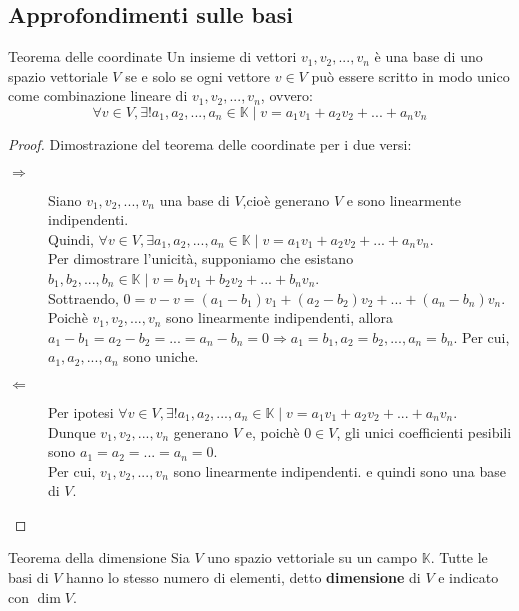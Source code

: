 \documentclass[a4paper]{article}
\theoremstyle{definition}
\begin{document}
\subsection{Approfondimenti sulle basi}
\begin{teo}{Teorema delle coordinate}{}
	Un insieme di vettori $v_1, v_2, ..., v_n$ è una base di uno spazio vettoriale $V$ se e solo se ogni vettore $v \in V$ può essere scritto in modo unico come combinazione lineare di $v_1, v_2, ..., v_n$, ovvero:
	\begin{equation*}
		\forall v \in V, \exists! a_1, a_2, ..., a_n \in \mathbb{K} \mid v = a_1v_1 + a_2v_2 + ... + a_nv_n
	\end{equation*}
\end{teo}
\begin{proof}
	Dimostrazione del teorema delle coordinate per i due versi:
	\begin{description}
		\item[$\Rightarrow$] Siano $v_1, v_2, ..., v_n$ una base di $V$,cioè generano $V$ e sono linearmente indipendenti. \\
		      Quindi, $\forall v \in V, \exists a_1, a_2, ..., a_n \in \mathbb{K} \mid v = a_1v_1 + a_2v_2 + ... + a_nv_n$. \\
		      Per dimostrare l'unicità, supponiamo che esistano $b_1, b_2, ..., b_n \in \mathbb{K} \mid v = b_1v_1 + b_2v_2 + ... + b_nv_n$. \\
		      Sottraendo, $0 = v - v = (a_1 - b_1)v_1 + (a_2 - b_2)v_2 + ... + (a_n - b_n)v_n$. \\
		      Poichè $v_1, v_2, ..., v_n$ sono linearmente indipendenti, allora $a_1 - b_1 = a_2 - b_2 = ... = a_n - b_n = 0 \Rightarrow a_1 = b_1, a_2 = b_2, ..., a_n = b_n$.
		      Per cui, $a_1, a_2, ..., a_n$ sono uniche.
		\item[$\Leftarrow$] Per ipotesi $\forall v \in V, \exists! a_1, a_2, ..., a_n \in \mathbb{K} \mid v = a_1v_1 + a_2v_2 + ... + a_nv_n$. \\
		      Dunque $v_1, v_2, ..., v_n$ generano $V$ e, poichè $0 \in V$, gli unici coefficienti pesibili sono $a_1 = a_2 = ... = a_n = 0$. \\
		      Per cui, $v_1, v_2, ..., v_n$ sono linearmente indipendenti. e quindi sono una base di $V$.
	\end{description}
\end{proof}
\begin{teo}{Teorema della dimensione}{}
	Sia $V$ uno spazio vettoriale su un campo $\mathbb{K}$. Tutte le basi di $V$ hanno lo stesso numero di elementi, detto \textbf{dimensione} di $V$ e indicato con $\dim V$.
\end{teo}
\end{document}
